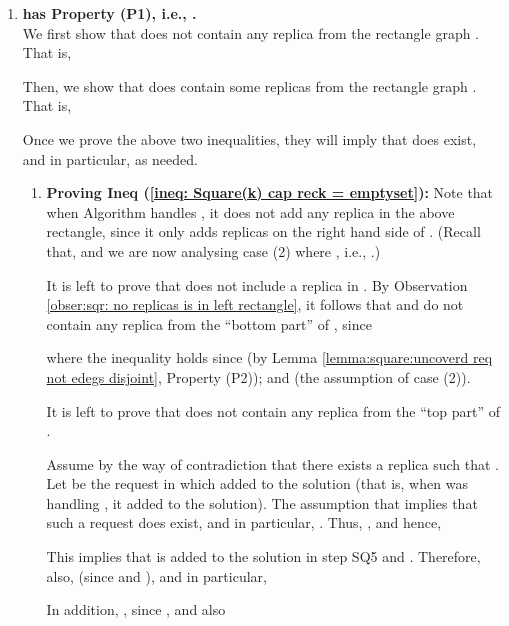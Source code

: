\documentclass[11pt]{article}
\begin{document}
\begin{enumerate}





\item {\bf  has Property (P1), i.e., .}\\
We first show that  does not contain  any replica from the rectangle graph .
That is,

Then, we show that  does contain some replicas from the rectangle graph .
That is,

Once we prove the above two inequalities, they will imply that  does exist, and in particular,  as needed.



\begin{enumerate}
\item[] {\bf Proving Ineq (\ref{ineq: Square(k) cap reck = emptyset}):}
Note that when Algorithm  handles , it does not add any replica in the above rectangle,
since it only adds replicas on the right hand side of .
(Recall that,  and we are now analysing case (2) where , i.e., .)

\vspace{1cm}
It is left to prove that  does not include a replica in .
By Observation \ref{obser:sqr: no replicas is in left rectangle},
it follows that  and  do not contain  any replica from the ``bottom part'' of ,
since

where the inequality holds since
 (by Lemma \ref{lemma:square:uncoverd req not edegs disjoint}, Property (P2)); and
 (the assumption of case (2)).





It is left to prove that  does not contain any replica from the ``top part'' of .

\vspace{0.2cm}

Assume by the way of contradiction that there exists a replica  such that .
Let  be the request in which  added  to the solution (that is, when  was handling , it added  to the solution).
The assumption that  implies that such a request  does exist, and in particular, .
Thus, , and hence,

This implies that  is added to the solution in step SQ5 and
.
Therefore, also,  (since  and ), and in particular,



\vspace{0.5cm}


In addition, , since , and also


\end{enumerate}
\end{enumerate}
\end{document}

